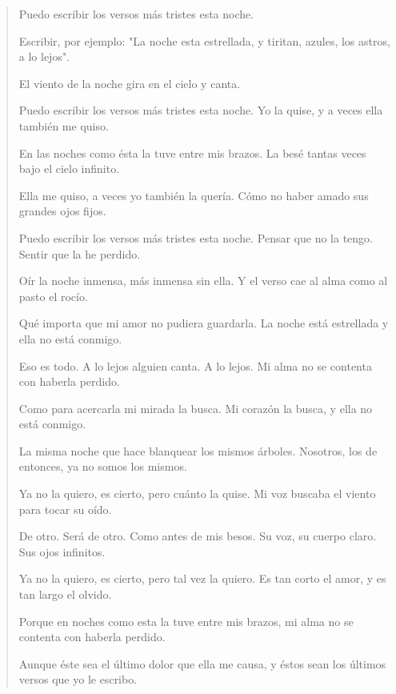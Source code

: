 \documentclass[12pt]{article}
\begin{document}
\clearpage
{}
\begin{verse}
Puedo escribir los versos más tristes esta noche.  
  
Escribir, por ejemplo: "La noche esta estrellada,  
y tiritan, azules, los astros, a lo lejos".  
  
El viento de la noche gira en el cielo y canta.  
  
Puedo escribir los versos más tristes esta noche.  
Yo la quise, y a veces ella también me quiso.  
  
En las noches como ésta la tuve entre mis brazos.  
La besé tantas veces bajo el cielo infinito.  
  
Ella me quiso, a veces yo también la quería.  
Cómo no haber amado sus grandes ojos fijos.  
  
Puedo escribir los versos más tristes esta noche.  
Pensar que no la tengo. Sentir que la he perdido.  
  
Oír la noche inmensa, más inmensa sin ella.  
Y el verso cae al alma como al pasto el rocío.  
  
Qué importa que mi amor no pudiera guardarla.  
La noche está estrellada y ella no está conmigo.  
  
Eso es todo. A lo lejos alguien canta. A lo lejos.  
Mi alma no se contenta con haberla perdido.  
  
Como para acercarla mi mirada la busca.  
Mi corazón la busca, y ella no está conmigo.  
  
La misma noche que hace blanquear los mismos árboles.  
Nosotros, los de entonces, ya no somos los mismos.  
  
Ya no la quiero, es cierto, pero cuánto la quise.  
Mi voz buscaba el viento para tocar su oído.  
  
De otro. Será de otro. Como antes de mis besos.  
Su voz, su cuerpo claro. Sus ojos infinitos.  
  
Ya no la quiero, es cierto, pero tal vez la quiero.  
Es tan corto el amor, y es tan largo el olvido.  
  
Porque en noches como esta la tuve entre mis brazos,  
mi alma no se contenta con haberla perdido.  
  
Aunque éste sea el último dolor que ella me causa,  
y éstos sean los últimos versos que yo le escribo.

\end{verse}
\end{document}
